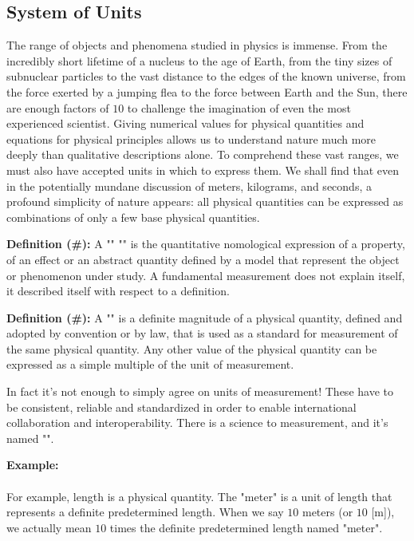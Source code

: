 	\pagebreak
	\subsection{System of Units}
	The range of objects and phenomena studied in physics is immense. From the incredibly short lifetime of a nucleus to the age of Earth, from the tiny sizes of subnuclear particles to the vast distance to the edges of the known universe, from the force exerted by a jumping flea to the force between Earth and the Sun, there are enough factors of $10$ to challenge the imagination of even the most experienced scientist. Giving numerical values for physical quantities and equations for physical principles allows us to understand nature much more deeply than qualitative descriptions alone. To comprehend these vast ranges, we must also have accepted units in which to express them. We shall find that even in the potentially mundane discussion of meters, kilograms, and seconds, a profound simplicity of nature appears: all physical quantities can be expressed as combinations of only a few base physical quantities.

	\textbf{Definition (\#\mydef):} A "" "" is the quantitative nomological expression of a property, of an effect or an abstract quantity defined by a model that represent the object or phenomenon under study. A fundamental measurement does not explain itself, it described itself with respect to a definition. 
	
	\textbf{Definition (\#\mydef):} A "" is a definite magnitude of a physical quantity, defined and adopted by convention or by law, that is used as a standard for measurement of the same physical quantity. Any other value of the physical quantity can be expressed as a simple multiple of the unit of measurement.
	
	In fact it's not enough to simply agree on units of measurement! These have to be consistent, reliable and standardized in order to enable international collaboration and interoperability. There is a science to measurement, and it's named "".
	
	\begin{tcolorbox}[colframe=black,colback=white,sharp corners]
	\textbf{{\Large {}}Example:}\\\\
	For example, length is a physical quantity. The "meter" is a unit of length that represents a definite predetermined length. When we say $10$ meters (or $10$ [m]), we actually mean $10$ times the definite predetermined length named "meter".
	\end{tcolorbox}
	
